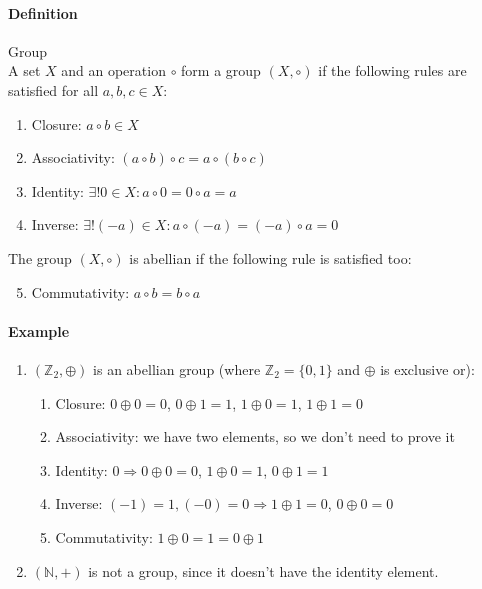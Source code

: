 \documentclass{article}
\newcommand{\N}{\mathbb{N}}
\newcommand{\Z}{\mathbb{Z}}
\newcommand{\Def}{\paragraph{Definition}}
\newcommand{\Example}{\paragraph{Example}}
\begin{document}
  \Def Group
\\A set $X$ and an operation $\circ$ form a group $(X, \circ)$ if the following
  rules are satisfied for all $a, b, c \in X$:
  \begin{enumerate}[label=(\roman*)]
    \item Closure: $a \circ b \in X$

    \item Associativity: $(a \circ b) \circ c = a \circ (b \circ c)$

    \item Identity: $\exists! 0 \in X : a \circ 0 = 0 \circ a = a$

    \item Inverse: $\exists! (-a) \in X : a \circ (-a) = (-a) \circ a = 0$
    \end{enumerate}
    The group $(X, \circ)$ is abellian if the following rule is satisfied too:
    \begin{enumerate}[label=(\roman*)]
    \setcounter{enumi}{4}
    \item Commutativity: $a \circ b = b \circ a$
  \end{enumerate}

  \Example
  \begin{enumerate}[label=(\arabic*)]
    \item $(\Z_2, \oplus)$ is an abellian group (where $\Z_2 = \{ 0, 1 \}$ and
    $\oplus$ is exclusive or):
    \begin{enumerate}[label=(\roman*)]
      \item Closure: $0 \oplus 0 = 0$, $0 \oplus 1 = 1$, $1 \oplus 0 = 1$,
      $1 \oplus 1 = 0$
      \item Associativity: we have two elements, so we don't need to prove it
      \item Identity: $0 \Rightarrow 0 \oplus 0 = 0$, $1 \oplus 0 = 1$,
      $0 \oplus 1 = 1$
      \item Inverse: $(-1) = 1, (-0) = 0 \Rightarrow 1 \oplus 1 = 0$,
      $0 \oplus 0 = 0$
      \item Commutativity: $1 \oplus 0 = 1 = 0 \oplus 1$
    \end{enumerate}

    \item $(\N, +)$ is not a group, since it doesn't have the identity element.
  \end{enumerate}
\end{document}
